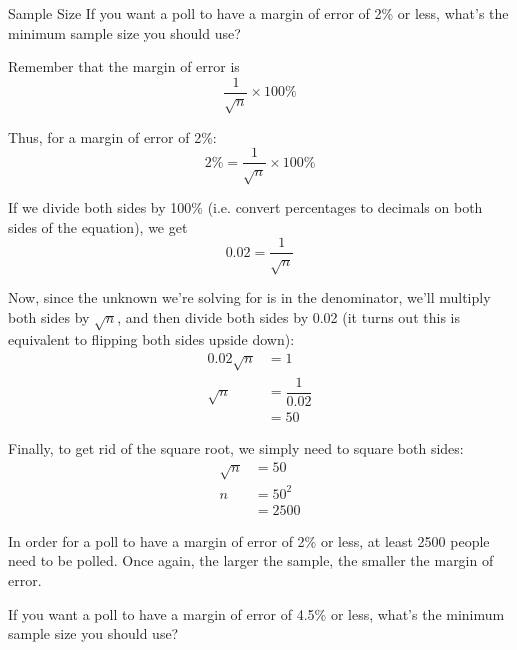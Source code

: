 \begin{example}{Sample Size}
If you want a poll to have a margin of error of 2\% or less, what's the minimum sample size you should use?

\sol
Remember that the margin of error is 
\[\dfrac{1}{\sqrt{n}} \times 100\%\]

Thus, for a margin of error of 2\%:
\[2\% = \dfrac{1}{\sqrt{n}} \times 100\%\]

If we divide both sides by 100\% (i.e. convert percentages to decimals on both sides of the equation), we get
\[0.02 = \dfrac{1}{\sqrt{n}}\]

Now, since the unknown we're solving for is in the denominator, we'll multiply both sides by $\sqrt{n}$, and then divide both sides by 0.02 (it turns out this is equivalent to flipping both sides upside down):
\begin{align*}
0.02\sqrt{n} &= 1\\
\sqrt{n} &= \dfrac{1}{0.02}\\
&= 50
\end{align*}

Finally, to get rid of the square root, we simply need to square both sides:
\begin{align*}
\sqrt{n} &= 50\\
n &= 50^2\\
&= \boxed{2500}
\end{align*}

In order for a poll to have a margin of error of 2\% or less, at least 2500 people need to be polled.  Once again, the larger the sample, the smaller the margin of error.
\end{example}

\begin{try}
If you want a poll to have a margin of error of 4.5\% or less, what's the minimum sample size you should use?
\end{try}